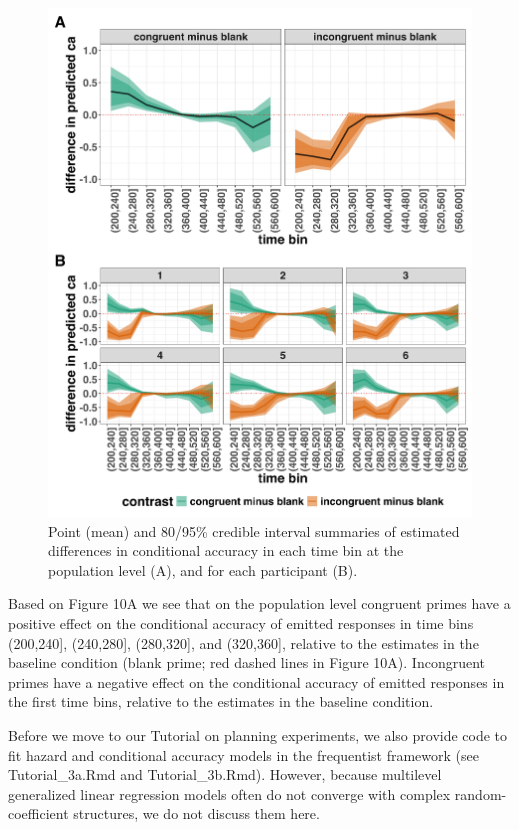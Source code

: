 \documentclass[
  man, donotrepeattitle,floatsintext]{apa6}
\begin{document}
\begin{figure}[H]

{\centering \includegraphics[width=0.8\linewidth,height=0.67\textheight,]{../Tutorial_2_Bayesian/figures/M1i_ca_ame_combined} 

}

\caption{Point (mean) and 80/95\% credible interval summaries of estimated differences in conditional accuracy in each time bin at the population level (A), and for each participant (B).}\label{fig:plot-ca-grand-ame-effects}
\end{figure}

Based on Figure 10A we see that on the population level congruent primes have a positive effect on the conditional accuracy of emitted responses in time bins (200,240{]}, (240,280{]}, (280,320{]}, and (320,360{]}, relative to the estimates in the baseline condition (blank prime; red dashed lines in Figure 10A).
Incongruent primes have a negative effect on the conditional accuracy of emitted responses in the first time bins, relative to the estimates in the baseline condition.

Before we move to our Tutorial on planning experiments, we also provide code to fit hazard and conditional accuracy models in the frequentist framework (see Tutorial\_3a.Rmd and Tutorial\_3b.Rmd). However, because multilevel generalized linear regression models often do not converge with complex random-coefficient structures, we do not discuss them here.
\end{document}
